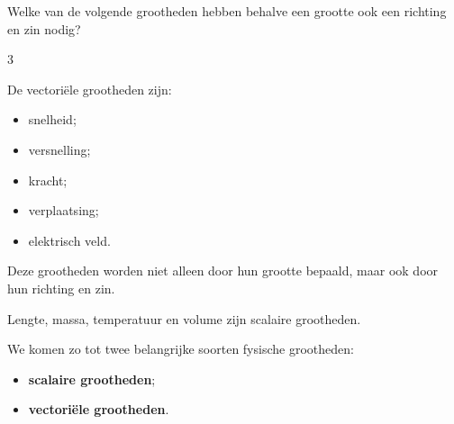 \documentclass{ximera}
\begin{document}
\begin{voorbeeld}
\begin{question}
Welke van de volgende grootheden hebben behalve een grootte ook een richting
en zin nodig?

\begin{selectAll}

\begin{multicols}{3}










\end{multicols}

\end{selectAll}

\begin{oplossing}
De vectoriële grootheden zijn:

\begin{itemize}
    \item snelheid;
    \item versnelling;
    \item kracht;
    \item verplaatsing;
    \item elektrisch veld.
\end{itemize}

Deze grootheden worden niet alleen door hun grootte bepaald, maar ook door
hun richting en zin.

Lengte, massa, temperatuur en volume zijn scalaire grootheden.
\end{oplossing}
\end{question}

\end{voorbeeld}


We komen zo tot twee belangrijke soorten fysische grootheden:

\begin{itemize}
    \item \textbf{scalaire grootheden};
    \item \textbf{vectoriële grootheden}.
\end{itemize}
\end{document}
